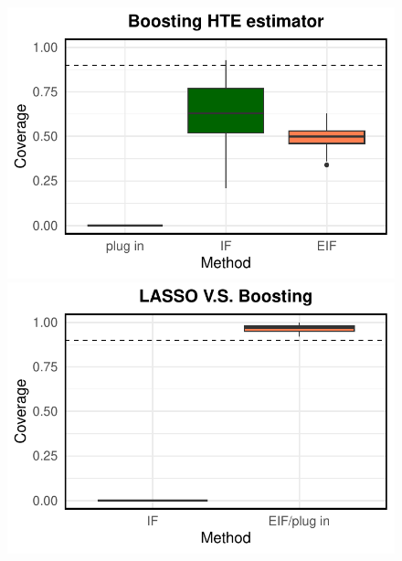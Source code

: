 \documentclass[twoside]{article}
\newcommand{\1}{{\mathbbm{1}}}
\begin{document}
\begin{figure}[ht]
\begin{minipage}{0.15\textwidth}
                \includegraphics[clip, trim = 0cm 0cm 0cm 0cm, width = \textwidth]{plot/simulation_linear_coverage_Boosting.pdf}
        \end{minipage}
        \begin{minipage}{0.15\textwidth}
                \centering
                \includegraphics[clip, trim = 0cm 0cm 0cm 0cm, width = \textwidth]{plot/simulation_linear_coverage_LASSO_V.S._Boosting.pdf}
        \end{minipage}        
        \\  \\ 
        \begin{minipage}{0.15\textwidth}
                \centering

\end{minipage}
\end{figure}
\end{document}
